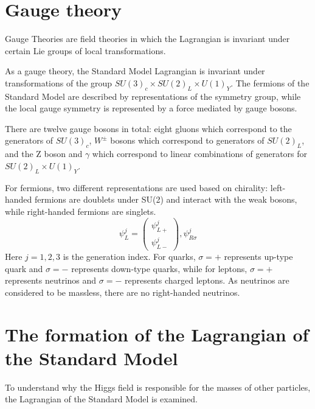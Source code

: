 \section{Gauge theory}
\par Gauge Theories are field theories in which the Lagrangian is invariant under certain Lie groups of local transformations.
\par As a gauge theory, the Standard Model Lagrangian is invariant under transformations of the group $SU(3)_c \times SU(2)_L \times U(1)_Y$. The fermions of the Standard Model are described by representations of the symmetry group, while the local gauge symmetry is represented by a force mediated by gauge bosons.


\par There are twelve gauge bosons in total: eight gluons which correspond to the generators of $SU(3)_c$, $W^{\pm}$ bosons which correspond to generators of $SU(2)_L$, and the Z boson and $\gamma$ which correspond to linear combinations of generators for $SU(2)_L \times U(1)_Y$.


\par For fermions, two different representations are used based on chirality: left-handed fermions are doublets under SU(2) and interact with the weak bosons, while right-handed fermions are singlets.
\begin{equation}
 \psi_L^{j}=\left( \begin{smallmatrix} \psi_{L+}^{j}\\ \psi_{L-}^{j} \end{smallmatrix}\right), \psi_{R\sigma}^{j}
 \label{eq:fermion}
\end{equation}
Here $j=1,2,3$ is the generation index. For quarks, $\sigma=+$ represents up-type quark and $\sigma=-$ represents down-type quarks, while for leptons, $\sigma=+$ represents neutrinos and $\sigma=-$ represents charged leptons. As neutrinos are considered to be massless, there are no right-handed neutrinos.


\section{The formation of the Lagrangian of the Standard Model}
\par To understand why the Higgs field is responsible for the masses of other particles, the Lagrangian of the Standard Model is examined.


